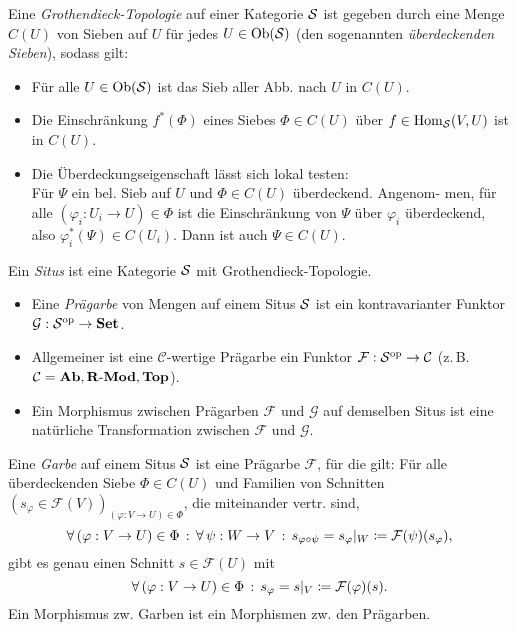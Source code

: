 \documentclass{cheat-sheet}
\newcommand{\Fais}{\mathcal{F}} %
\newcommand{\Garb}{\mathcal{G}} %
\begin{document}
\begin{defn}
  Eine \emph{Grothendieck-Topologie} auf einer Kategorie $\mathcal{S}$ ist gegeben durch eine Menge $C(U)$ von Sieben auf $U$ für jedes $U \in \operatorname{Ob}(\mathcal{S})$ (den sogenannten \emph{überdeckenden Sieben}), sodass gilt:
  \begin{itemize}
    \item Für alle $U \in \operatorname{Ob}(\mathcal{S})$ ist das Sieb aller Abb. nach $U$ in $C(U)$.
    \item Die Einschränkung $f^*(\Phi)$ eines Siebes $\Phi \in C(U)$ über $f \in \operatorname{Hom}_{\mathcal{S}}(V, U)$ ist in $C(U)$.
    \item Die Überdeckungseigenschaft lässt sich lokal testen: \\
    Für $\Psi$ ein bel. Sieb auf $U$ und $\Phi \in C(U)$ überdeckend. Angenom- men, für alle $(\varphi_i : U_i \to U) \in \Phi$ ist die Einschränkung von $\Psi$ über $\varphi_i$ überdeckend, also $\varphi_i^*(\Psi) \in C(U_i)$. Dann ist auch $\Psi \in C(U)$.
  \end{itemize}
\end{defn}


\begin{defn}
  Ein \emph{Situs} ist eine Kategorie $\mathcal{S}$ mit Grothendieck-Topologie.
\end{defn}

\begin{defn}
  \begin{itemize}
    \item Eine \emph{Prägarbe} von Mengen auf einem Situs $\mathcal{S}$ ist ein kontravarianter Funktor $\Garb : \Sit^\op \to \SetC$.
    \item Allgemeiner ist eine $\mathcal{C}$-wertige Prägarbe ein Funktor $\Fais : \Sit^\op \to \Cat$ (z.\,B. $\mathcal{C} = \mathbf{Ab}, \mathbf{R\text{-}Mod}, \mathbf{Top}$).
    \item Ein Morphismus zwischen Prägarben $\Fais$ und $\Garb$ auf demselben Situs ist eine natürliche Transformation zwischen $\Fais$ und $\Garb$.
  \end{itemize}
\end{defn}

\begin{defn}
  Eine \emph{Garbe} auf einem Situs $\mathcal{S}$ ist eine Prägarbe $\Fais$, für die gilt:
  Für alle überdeckenden Siebe $\Phi \in C(U)$ und Familien von Schnitten $(s_\varphi \in \Fais(V))_{(\varphi : V \to U) \in \Phi}$, die miteinander vertr. sind, \dh{}
  \[ \fa{(\varphi : V \to U) \in \Phi} \fa{\psi : W \to V} s_{\varphi \circ \psi} = s_\varphi|_W \coloneqq \Fais(\psi)(s_\varphi), \]
  gibt es genau einen Schnitt $s \in \Fais(U)$ mit
  \[ \fa{(\varphi : V \to U) \in \Phi} s_\varphi = s|_V \coloneqq \Fais(\varphi)(s). \]
  Ein Morphismus zw. Garben ist ein Morphismen zw. den Prägarben.
\end{defn}
\end{document}
